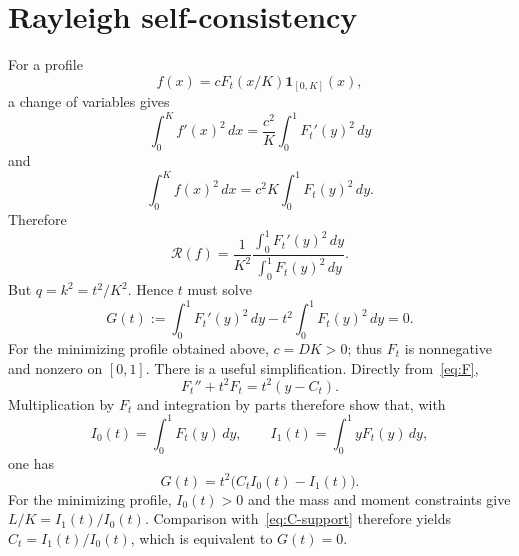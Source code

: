 \documentclass[11pt]{article}
\theoremstyle{definition}
\theoremstyle{remark}
\newcommand{\Rcal}{\mathcal R}
\begin{document}
\section{Rayleigh self-consistency}
For a profile
\[
 f(x)=cF_t(x/K)\mathbf1_{[0,K]}(x),
\]
a change of variables gives
\[
 \int_0^K f'(x)^2\,dx
 =\frac{c^2}{K}\int_0^1F_t'(y)^2\,dy
\]
and
\[
 \int_0^K f(x)^2\,dx
 =c^2K\int_0^1F_t(y)^2\,dy.
\]
Therefore
\[
 \Rcal(f)=\frac{1}{K^2}
 \frac{\int_0^1F_t'(y)^2\,dy}{\int_0^1F_t(y)^2\,dy}.
\]
But $q=k^2=t^2/K^2$. Hence $t$ must solve
\begin{equation}\label{eq:G}
 G(t):=\int_0^1F_t'(y)^2\,dy
 -t^2\int_0^1F_t(y)^2\,dy=0.
\end{equation}
For the minimizing profile obtained above, $c=DK>0$; thus $F_t$ is
nonnegative and nonzero on $[0,1]$.
There is a useful simplification. Directly from~\eqref{eq:F},
\[
 F_t''+t^2F_t=t^2(y-C_t).
\]
Multiplication by $F_t$ and integration by parts therefore show that, with
\[
 I_0(t)=\int_0^1F_t(y)\,dy,
 \qquad I_1(t)=\int_0^1yF_t(y)\,dy,
\]
one has
\begin{equation}\label{eq:G-moment}
 G(t)=t^2\bigl(C_tI_0(t)-I_1(t)\bigr).
\end{equation}
For the minimizing profile, $I_0(t)>0$ and the mass and moment constraints give
$L/K=I_1(t)/I_0(t)$. Comparison with~\eqref{eq:C-support} therefore yields
$C_t=I_1(t)/I_0(t)$, which is equivalent to $G(t)=0$.
\end{document}
